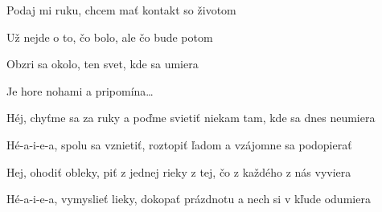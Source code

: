 \begin{song}
\bigskip

    \par
{}    \par

\bigskip

 Podaj mi ruku, chcem mať kontakt so životom \par
{} Už nejde o to, čo bolo, ale čo bude potom \par
{} Obzri sa okolo, ten svet, kde sa umiera \par
{} Je hore nohami a pripomína… \par

\bigskip

Héj, chyťme sa za ruky a poďme svietiť niekam tam, kde sa dnes neumiera \par
{} Hé-a-i-e-a,  spolu sa vznietiť,  roztopiť ľadom a vzájomne sa podopierať \par
{} Hej, ohodiť obleky, piť z jednej rieky z tej, čo z každého z nás vyviera \par
{} Hé-a-i-e-a,  vymyslieť lieky,  dokopať prázdnotu a nech si v kľude odumiera \par

\bigskip

     \par

\end{song}
